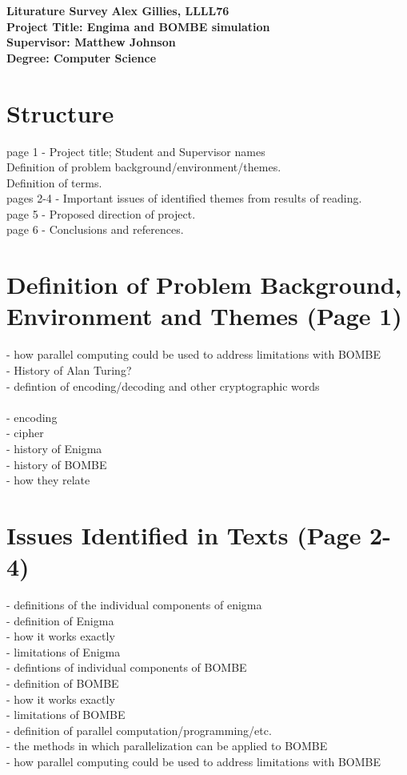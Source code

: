 \documentclass[a4paper, 11pt]{article}
\begin{document}
\noindent
\large\textbf{Liturature Survey} \hfill \textbf{Alex Gillies, LLLL76} \\
\large\textbf{Project Title: Engima and BOMBE simulation} \hfill \\
\large\textbf{Supervisor: Matthew Johnson} \hfill \\
\large\textbf{Degree: Computer Science} \hfill \\

\section*{Structure}
page 1 - Project title; Student and Supervisor names\\
Definition of problem background/environment/themes.\\
Definition of terms.\\
pages 2-4 -  Important issues of identified themes from results of reading.\\
page 5 - Proposed direction of project.\\
page 6 - Conclusions and references.\\


\section*{Definition of Problem Background, Environment and Themes (Page 1)}

- how parallel computing could be used to address limitations with BOMBE\\
- History of Alan Turing?\\
- defintion of encoding/decoding and other cryptographic words\\
\\
- encoding\\
- cipher\\
- history of Enigma\\
- history of BOMBE\\
- how they relate\\

\section*{Issues Identified in Texts (Page 2-4)}

- definitions of the individual components of enigma\\
- definition of Enigma\\
- how it works exactly\\
- limitations of Enigma\\
- defintions of individual components of BOMBE\\
- definition of BOMBE\\
- how it works exactly\\
- limitations of BOMBE\\
- definition of parallel computation/programming/etc.\\
- the methods in which parallelization can be applied to BOMBE\\
- how parallel computing could be used to address limitations with BOMBE\\
\end{document}
